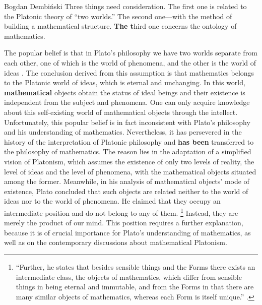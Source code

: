 \begin{artengenv}{Bogdan Dembiński}
Three things need consideration. The first one is related to the Platonic theory of ``two
worlds.'' The second one---with the method of building a mathematical structure. \textbf{The t}hird one
concerns the ontology of mathematics.

The popular belief is that in Plato’s philosophy we have two worlds separate from each other, one of which is the world
of phenomena, and the other is the world of ideas
\parencite{dembinski_streit_2007}.
The conclusion derived
from this assumption is that mathematics belongs to the Platonic world of ideas, which is eternal and unchanging. In
this world, \textbf{mathematical} objects obtain the status of ideal beings and their existence is independent from the
subject and phenomena. One can only acquire knowledge about this self-existing world of mathematical objects through
the intellect. Unfortunately, this popular belief is in fact inconsistent with Plato’s philosophy and his understanding
of mathematics. Nevertheless, it has persevered in the history of the interpretation of Platonic philosophy and
\textbf{has been }transferred to the philosophy of mathematics. The reason lies in the adaptation of a simplified
vision of Platonism, which assumes the existence of only two levels of reality, the level of ideas and the level of
phenomena, with the mathematical objects situated among the former. Meanwhile, in his analysis of mathematical objects'
mode of existence, Plato concluded that such objects are related neither to the world of ideas nor to the world of
phenomena. He claimed that they occupy an intermediate position and do not belong to any of them.
\footnote{``Further, he states that besides sensible things and the Forms there exists an intermediate class,
the objects of mathematics, which differ from sensible things in being eternal and immutable,
and from the Forms in that there
are many similar objects of mathematics, whereas each Form is itself unique.''
\parencite[987b]{aristotle_aristotles_1924}.
}
Instead, they are merely the product of our mind. This position requires a further explanation, because it is of
crucial importance for Plato’s understanding of mathematics, as well as on the contemporary discussions about
mathematical Platonism.


\end{artengenv}

